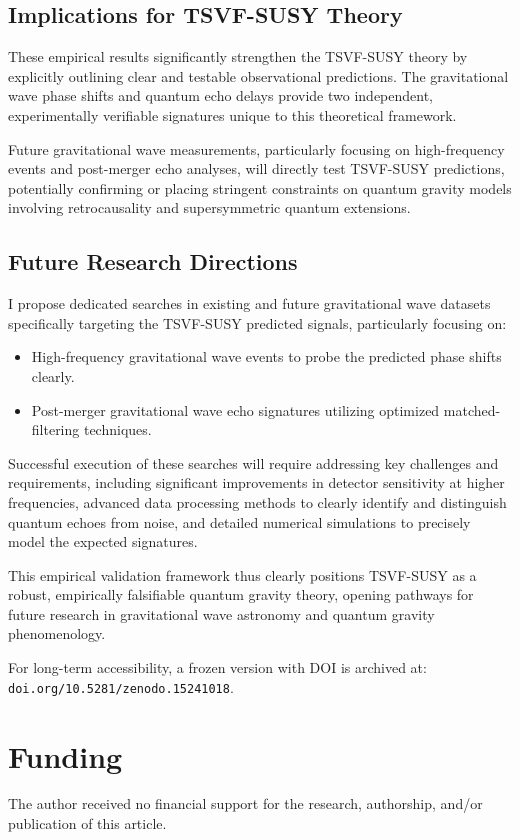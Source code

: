 \documentclass[twocolumn,superscriptaddress,floatfix]{revtex4-2}
\begin{document}
\subsection{Implications for TSVF-SUSY Theory}\label{subsec:implications_tsvf_susy}
These empirical results significantly strengthen the TSVF-SUSY theory by explicitly outlining clear and testable observational predictions. The gravitational wave phase shifts and quantum echo delays provide two independent, experimentally verifiable signatures unique to this theoretical framework.

Future gravitational wave measurements, particularly focusing on high-frequency events and post-merger echo analyses, will directly test TSVF-SUSY predictions, potentially confirming or placing stringent constraints on quantum gravity models involving retrocausality and supersymmetric quantum extensions.

\subsection{Future Research Directions}\label{subsec:future_research_directions}
I propose dedicated searches in existing and future gravitational wave datasets specifically targeting the TSVF-SUSY predicted signals, particularly focusing on:
\begin{itemize}
    \item High-frequency gravitational wave events to probe the predicted phase shifts clearly.
    \item Post-merger gravitational wave echo signatures utilizing optimized matched-filtering techniques.
\end{itemize}

Successful execution of these searches will require addressing key challenges and requirements, including significant improvements in detector sensitivity at higher frequencies, advanced data processing methods to clearly identify and distinguish quantum echoes from noise, and detailed numerical simulations to precisely model the expected signatures.

This empirical validation framework thus clearly positions TSVF-SUSY as a robust, empirically falsifiable quantum gravity theory, opening pathways for future research in gravitational wave astronomy and quantum gravity phenomenology.

For long-term accessibility, a frozen version with DOI is archived at:  
\texttt{doi.org/10.5281/zenodo.15241018}.

\section*{Funding}
The author received no financial support for the research, authorship, and/or publication of this article.


\end{document}
